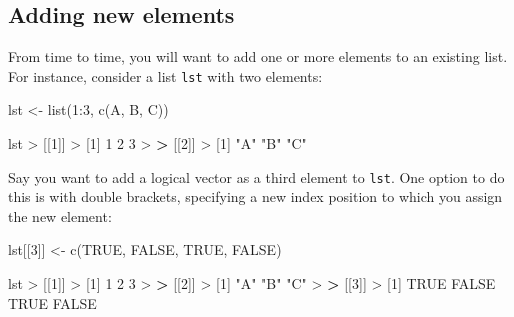 \documentclass[
]{book}
\newenvironment{Shaded}{\begin{snugshade}}{\end{snugshade}}
\newcommand{\ConstantTok}[1]{\textcolor[rgb]{0.00,0.00,0.00}{#1}}
\newcommand{\DecValTok}[1]{\textcolor[rgb]{0.00,0.00,0.81}{#1}}
\newcommand{\ErrorTok}[1]{\textcolor[rgb]{0.64,0.00,0.00}{\textbf{#1}}}
\newcommand{\FunctionTok}[1]{\textcolor[rgb]{0.00,0.00,0.00}{#1}}
\newcommand{\NormalTok}[1]{#1}
\newcommand{\OtherTok}[1]{\textcolor[rgb]{0.56,0.35,0.01}{#1}}
\newcommand{\SpecialCharTok}[1]{\textcolor[rgb]{0.00,0.00,0.00}{#1}}
\newcommand{\StringTok}[1]{\textcolor[rgb]{0.31,0.60,0.02}{#1}}
\begin{document}
\hypertarget{adding-new-elements}{%
\subsection{Adding new elements}\label{adding-new-elements}}

From time to time, you will want to add one or more elements to an existing
list. For instance, consider a list \texttt{lst} with two elements:

\begin{Shaded}
\begin{Highlighting}[]
\NormalTok{lst }\OtherTok{\textless{}{-}} \FunctionTok{list}\NormalTok{(}\DecValTok{1}\SpecialCharTok{:}\DecValTok{3}\NormalTok{, }\FunctionTok{c}\NormalTok{(}\StringTok{\textquotesingle{}A\textquotesingle{}}\NormalTok{, }\StringTok{\textquotesingle{}B\textquotesingle{}}\NormalTok{, }\StringTok{\textquotesingle{}C\textquotesingle{}}\NormalTok{))}

\NormalTok{lst}
\SpecialCharTok{\textgreater{}}\NormalTok{ [[}\DecValTok{1}\NormalTok{]]}
\SpecialCharTok{\textgreater{}}\NormalTok{ [}\DecValTok{1}\NormalTok{] }\DecValTok{1} \DecValTok{2} \DecValTok{3}
\SpecialCharTok{\textgreater{}} 
\ErrorTok{\textgreater{}}\NormalTok{ [[}\DecValTok{2}\NormalTok{]]}
\SpecialCharTok{\textgreater{}}\NormalTok{ [}\DecValTok{1}\NormalTok{] }\StringTok{"A"} \StringTok{"B"} \StringTok{"C"}
\end{Highlighting}
\end{Shaded}

Say you want to add a logical vector as a third element to \texttt{lst}. One option to
do this is with double brackets, specifying a new index position to which you
assign the new element:

\begin{Shaded}
\begin{Highlighting}[]
\NormalTok{lst[[}\DecValTok{3}\NormalTok{]] }\OtherTok{\textless{}{-}} \FunctionTok{c}\NormalTok{(}\ConstantTok{TRUE}\NormalTok{, }\ConstantTok{FALSE}\NormalTok{, }\ConstantTok{TRUE}\NormalTok{, }\ConstantTok{FALSE}\NormalTok{)}

\NormalTok{lst}
\SpecialCharTok{\textgreater{}}\NormalTok{ [[}\DecValTok{1}\NormalTok{]]}
\SpecialCharTok{\textgreater{}}\NormalTok{ [}\DecValTok{1}\NormalTok{] }\DecValTok{1} \DecValTok{2} \DecValTok{3}
\SpecialCharTok{\textgreater{}} 
\ErrorTok{\textgreater{}}\NormalTok{ [[}\DecValTok{2}\NormalTok{]]}
\SpecialCharTok{\textgreater{}}\NormalTok{ [}\DecValTok{1}\NormalTok{] }\StringTok{"A"} \StringTok{"B"} \StringTok{"C"}
\SpecialCharTok{\textgreater{}} 
\ErrorTok{\textgreater{}}\NormalTok{ [[}\DecValTok{3}\NormalTok{]]}
\SpecialCharTok{\textgreater{}}\NormalTok{ [}\DecValTok{1}\NormalTok{]  }\ConstantTok{TRUE} \ConstantTok{FALSE}  \ConstantTok{TRUE} \ConstantTok{FALSE}
\end{Highlighting}
\end{Shaded}
\end{document}
